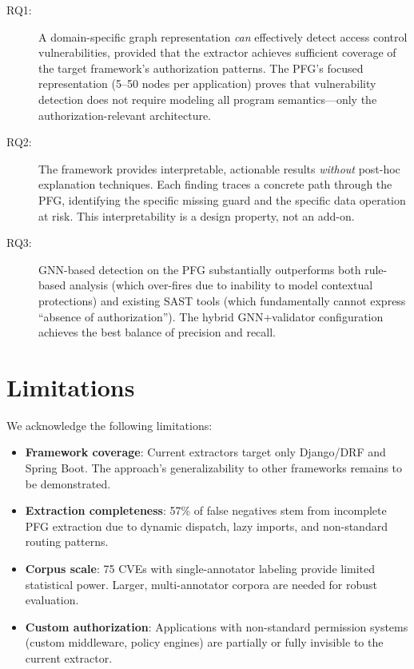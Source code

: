 \begin{description}
    \item[RQ1:] A domain-specific graph representation \emph{can} effectively detect access control vulnerabilities, provided that the extractor achieves sufficient coverage of the target framework's authorization patterns. The PFG's focused representation (5--50 nodes per application) proves that vulnerability detection does not require modeling all program semantics—only the authorization-relevant architecture.

    \item[RQ2:] The framework provides interpretable, actionable results \emph{without} post-hoc explanation techniques. Each finding traces a concrete path through the PFG, identifying the specific missing guard and the specific data operation at risk. This interpretability is a design property, not an add-on.

    \item[RQ3:] GNN-based detection on the PFG substantially outperforms both rule-based analysis (which over-fires due to inability to model contextual protections) and existing SAST tools (which fundamentally cannot express ``absence of authorization''). The hybrid GNN+validator configuration achieves the best balance of precision and recall.
\end{description}

\section*{Limitations}

We acknowledge the following limitations:
\begin{itemize}
    \item \textbf{Framework coverage}: Current extractors target only Django/DRF and Spring Boot. The approach's generalizability to other frameworks remains to be demonstrated.
    \item \textbf{Extraction completeness}: 57\% of false negatives stem from incomplete PFG extraction due to dynamic dispatch, lazy imports, and non-standard routing patterns.
    \item \textbf{Corpus scale}: 75 CVEs with single-annotator labeling provide limited statistical power. Larger, multi-annotator corpora are needed for robust evaluation.
    \item \textbf{Custom authorization}: Applications with non-standard permission systems (custom middleware, policy engines) are partially or fully invisible to the current extractor.
\end{itemize}

